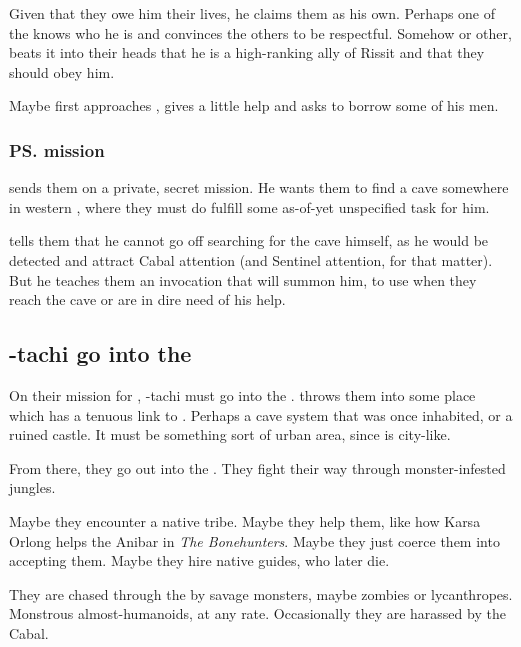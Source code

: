 Given that they owe him their lives, he claims them as his own. Perhaps one of the \Gisshorns{} knows who he is and convinces the others to be respectful. Somehow or other, \Ishnaruchaefir{} beats it into their heads that he is a high-ranking ally of Rissit and that they should obey him. 

Maybe \Ishnaruchaefir{} first approaches \Narkiza{}, gives a little help and asks to borrow some of his men. 






\subsubsection{\ps{\Ishnaruchaefir} mission}
\Ishnaruchaefir{} sends them on a private, secret mission. He wants them to find a cave somewhere in western \Velcad{}, where they must do fulfill some as-of-yet unspecified task for him. 

\Ishnaruchaefir{} tells them that he cannot go off searching for the cave himself, as he would be detected and attract Cabal attention (and Sentinel attention, for that matter). But he teaches them an invocation that will summon him, to use when they reach the cave or are in dire need of his help. 








\subsection{\Shilred-tachi go into the \Wylde}
On their mission for \Ishnaruchaefir, \Shilred-tachi must go into the \Wylde{}. \Ishnaruchaefir{} throws them into some place which has a tenuous link to \Nyx. Perhaps a cave system that was once inhabited, or a ruined castle. It must be something sort of urban area, since \Nyx{} is city-like. 

From there, they go out into the \Wylde{}. They fight their way through monster-infested jungles. 

Maybe they encounter a native tribe. Maybe they help them, like how Karsa Orlong helps the Anibar in \emph{The Bonehunters}. Maybe they just coerce them into accepting them. Maybe they hire native guides, who later die. 

They are chased through the \Wylde{} by savage monsters, maybe zombies or lycanthropes. Monstrous almost-humanoids, at any rate. Occasionally they are harassed by the Cabal. 








